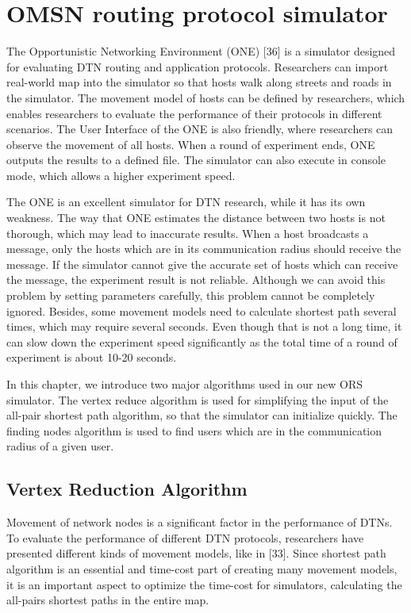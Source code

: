 


\chapter{ OMSN routing protocol simulator}
\label{OPS}

\noindent The Opportunistic Networking Environment (ONE) [36] is a simulator designed for evaluating DTN routing and application protocols. Researchers can import real-world map into the simulator so that hosts walk along streets and roads in the simulator. The movement model of hosts can be defined by researchers, which enables researchers to evaluate the performance of their protocols in different scenarios. The User Interface of the ONE is also friendly, where researchers can observe the movement of all hosts. When a round of experiment ends, ONE outputs the results to a defined file. The simulator can also execute in console mode, which allows a higher experiment speed.

The ONE is an excellent simulator for DTN research, while it has its own weakness. The way that ONE estimates the distance between two hosts is not thorough, which may lead to inaccurate results. When a host broadcasts a message, only the hosts which are in its communication radius should receive the message. If the simulator cannot give the accurate set of hosts which can receive the message, the experiment result is not reliable. Although we can avoid this problem by setting parameters carefully, this problem cannot be completely ignored. Besides, some movement models need to calculate shortest path several times, which may require several seconds. Even though that is not a long time, it can slow down the experiment speed significantly as the total time of a round of experiment is about 10-20 seconds. 

In this chapter, we introduce two major algorithms used in our new ORS simulator. The vertex reduce algorithm is used for simplifying the input of the all-pair shortest path algorithm, so that the simulator can initialize quickly. The finding nodes algorithm is used to find users which are in the communication radius of a given user.


\section{ Vertex Reduction Algorithm}

\noindent Movement of network nodes is a significant factor in the performance of DTNs. To evaluate the performance of different DTN protocols, researchers have presented different kinds of movement models, like in [33]. Since shortest path algorithm is an essential and time-cost part of creating many movement models, it is an important aspect to optimize the time-cost for simulators, calculating the all-pairs shortest paths in the entire map.

